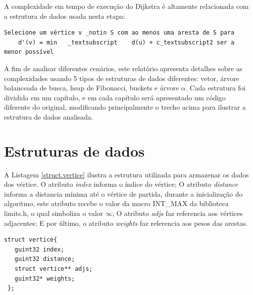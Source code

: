 \documentclass[
	12pt,				%
	oneside,			%
	a4paper,			%
	english,			%
	french,				%
	spanish,			%
	brazil,				%
	]{abntex2}
\begin{document}
A complexidade em tempo de execução do Dijkstra é altamente relacionada com a estrutura de dados usada nesta etapa:

\begin{lstlisting}
Selecione um vértice v _notin S com ao menos uma aresta de S para
    d'(v) = min   _textsubscript    d(u) + c_textsubscript2 ser a menor possível
\end{lstlisting}

A fim de analisar diferentes cenários, este relatório apresenta detalhes sobre as complexidades usando 5 tipos de estruturas de dados diferentes: vetor, árvore balanceada de busca, heap de Fibonacci, buckets e árvore $\alpha$.
Cada estrutura foi dividida em um capítulo, e em cada capítulo será apresentado um código diferente do original, modificando principalmente o trecho acima para ilustrar a estrutura de dados analisada.



\chapter{Estruturas de dados}

A Listagem \ref{struct.vertice} ilustra a estrutura utilizada para armazenar os dados dos vértice. O atributo \emph{index} informa o índice do vértice; O atributo \emph{distance} informa a distancia mínima até o vértice de partida, durante a inicialização do algoritmo, este atributo recebe o valor da macro INT\_MAX da biblioteca \textsf{limits.h}, o qual simboliza o valor $\infty$; O atributo \emph{adjs} faz referencia aos vértices adjacentes; E por último, o atributo \emph{weights} faz referencia aos pesos das arestas.

\begin{lstlisting}[caption=Estrutura de um vértice, label=struct.vertice]
 struct vertice{
   guint32 index;
   guint32 distance;
   struct vertice** adjs;
   guint32* weights;
 };
\end{lstlisting}
\end{document}
